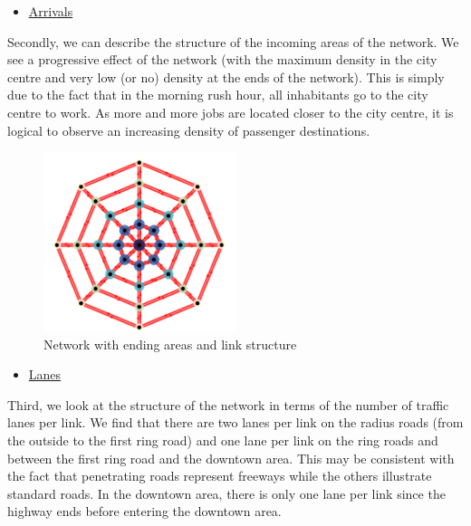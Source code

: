 \documentclass[a4paper, 12pt,oneside]{article}
\begin{document}
\begin{itemize}
    \item \underline{Arrivals}
\end{itemize}

Secondly, we can describe the structure of the incoming areas of the network.
We see a progressive effect of the network (with the maximum density in the city centre and very low (or no) density at the ends of the network).
This is simply due to the fact that in the morning rush hour, all inhabitants go to the city centre to work. As more and more jobs are located closer to the city centre, it is logical to observe an increasing density of passenger destinations.

\begin{figure}[H]
    \centering
    \includegraphics[width=0.5\textwidth]{Images/capture arrival link.png}
    \caption{Network with ending areas and link structure}
\end{figure}






\begin{itemize}
    \item \underline{Lanes}
\end{itemize}

Third, we look at the structure of the network in terms of the number of traffic lanes per link. We find that there are two lanes per link on the radius roads (from the outside to the first ring road) and one lane per link on the ring roads and between the first ring road and the downtown area. This may be consistent with the fact that penetrating roads represent freeways while the others illustrate standard roads.
In the downtown area, there is only one lane per link since the highway ends before entering the downtown area.
\end{document}

